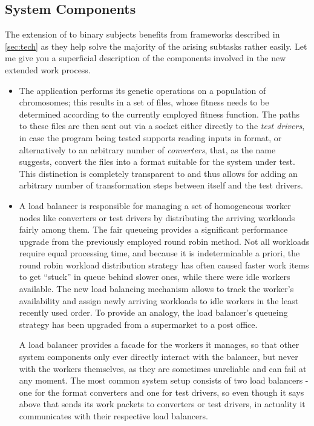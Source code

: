 \subsection{System Components}
\label{sec:components}
The extension of \xmlmate to binary subjects benefits from frameworks described in \cref{sec:tech} as they 
help solve the majority of the arising subtasks rather easily. Let me give you a superficial description
of the components involved in the new extended \xmlmate work process. 
\begin{itemize}
  \item The \java application \xmlmate performs its genetic operations on a population of chromosomes; this 
  results in a set of \xml files, whose fitness needs to be determined according to the currently employed
  fitness function. The paths to these files are then sent out via a \zmq socket either directly to the
  \emph{test drivers}, in case the program being tested supports reading inputs in \xml format, or alternatively 
  to an arbitrary number of \emph{converters}, that, as the name suggests, convert the \xml files into a format 
  suitable for the system under test. This distinction is completely transparent to \xmlmate and thus allows for 
  adding an arbitrary number of transformation steps between itself and the test drivers.
  
  \item A load balancer is responsible for managing a set of homogeneous worker nodes like converters or test
  drivers by distributing the arriving workloads fairly among them. The fair queueing provides a significant
  performance upgrade from the previously employed round robin method. Not all workloads require equal
  processing time, and because it is indeterminable a priori, the round robin workload distribution strategy
  has often caused faster work items to get ``stuck'' in queue behind slower ones, while there were idle
  workers available. The new load balancing mechanism allows to track the worker's availability and assign
  newly arriving workloads to idle workers in the least recently used order. To provide an analogy, the load
  balancer's queueing strategy has been upgraded from a supermarket to a post office. 
  
  A load balancer provides a facade for the workers it manages, so that other system components only ever
  directly interact with the balancer, but never with the workers themselves, as they are sometimes unreliable
  and can fail at any moment. The most common system setup consists of two load balancers - one for the format
  converters and one for test drivers, so even though it says above that \xmlmate sends its work packets to
  converters or test drivers, in actuality it communicates with their respective load balancers. 
    

\end{itemize}
